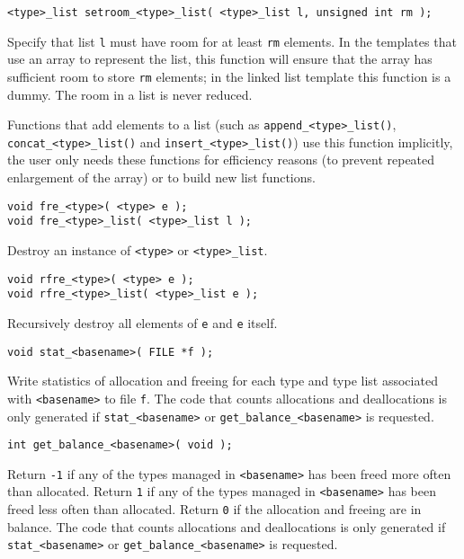 \begin{verbatim}
<type>_list setroom_<type>_list( <type>_list l, unsigned int rm );
\end{verbatim}
\begin{desc}
Specify that list {\tt l} must have room for at least {\tt rm} elements.
In the templates that use an array to represent the list,
this function will ensure that the array has sufficient room to
store {\tt rm} elements;
in the linked list template this function is a dummy.
The room in a list is never reduced.
\par
Functions that add elements to a list (such as \verb+append_<type>_list()+,
\verb+concat_<type>_list()+ and
\verb+insert_<type>_list()+) use this function implicitly, the
user only needs these functions for efficiency reasons
(to prevent repeated enlargement of the array)
or to build new list functions.
\end{desc}
\begin{verbatim}
void fre_<type>( <type> e );
void fre_<type>_list( <type>_list l );
\end{verbatim}
\begin{desc}
Destroy an instance of {\tt <type>} or {\tt <type>\_list}.
\end{desc}
\begin{verbatim}
void rfre_<type>( <type> e );
void rfre_<type>_list( <type>_list e );
\end{verbatim}
\begin{desc}
Recursively destroy all elements of {\tt e} and {\tt e} itself.
\end{desc}
\begin{verbatim}
void stat_<basename>( FILE *f );
\end{verbatim}
\begin{desc}
Write statistics of allocation and freeing for each type and type list
associated with {\tt <basename>} to file {\tt f}. The code that counts
allocations and deallocations is only generated if \verb'stat_<basename>'
or \verb'get_balance_<basename>' is requested.
\end{desc}
\begin{verbatim}
int get_balance_<basename>( void );
\end{verbatim}
\begin{desc}
\begin{sloppypar}
Return \verb+-1+ if any of the types managed in \verb"<basename>"
has been freed more often than allocated.  Return \verb+1+ if any of
the types managed in \verb"<basename>" has been freed less often than
allocated. Return \verb+0+ if the allocation and freeing are in balance.
The code that counts allocations and deallocations is only generated if
\verb'stat_<basename>' or \verb'get_balance_<basename>' is requested.
\end{sloppypar}
\end{desc}
